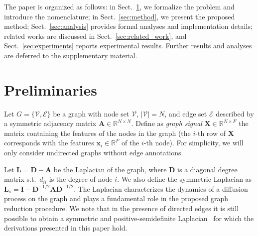 \documentclass[journal]{IEEEtran}
\def\x{{\mathbf x}}
\def\X{{\mathbf X}}
\def\A{{\mathbf A}}
\def\L{{\mathbf L}}
\def\D{{\mathbf D}}
\def\I{{\mathbf I}}
\begin{document}
The paper is organized as follows: in Sect.~\ref{sec:preliminaries}, we formalize the problem and introduce the nomenclature; in Sect.~\ref{sec:method}, we present the proposed method; Sect.~\ref{sec:analysis} provides formal analyses and implementation details; related works are discussed in Sect.~\ref{sec:related_work}, and Sect.~\ref{sec:experiments} reports experimental results.
Further results and analyses are deferred to the supplementary material.

\section{Preliminaries}
\label{sec:preliminaries}
Let $G = \{\mathcal{V}, \mathcal{E} \}$ be a graph with node set $\mathcal{V}$, $|\mathcal{V}| = N$, and edge set $\mathcal{E}$ described by a symmetric adjacency matrix $\A \in \mathbb{R}^{N \times N}$. 
Define as \textit{graph signal} $\X \in \mathbb{R}^{N \times F}$ the matrix containing the features of the nodes in the graph (the $i$-th row of $\X$ corresponds with the features $\x_i \in \mathbb{R}^F$ of the $i$-th node).
For simplicity, we will only consider undirected graphs without edge annotations. 

Let $\L = \D - \A$ be the Laplacian of the graph, where $\D$ is a diagonal degree matrix s.t.\ $d_{ii}$ is the degree of node $i$.
We also define the symmetric Laplacian as $\L_s = \I - \D^{-1/2} \A \D^{-1/2}$.
The Laplacian characterizes the dynamics of a diffusion process on the graph and plays a fundamental role in the proposed graph reduction procedure. 
We note that in the presence of directed edges it is still possible to obtain a symmetric and positive-semidefinite Laplacian~\cite{chung2005laplacians, sandryhaila2013discrete} for which the derivations presented in this paper hold.
\end{document}
